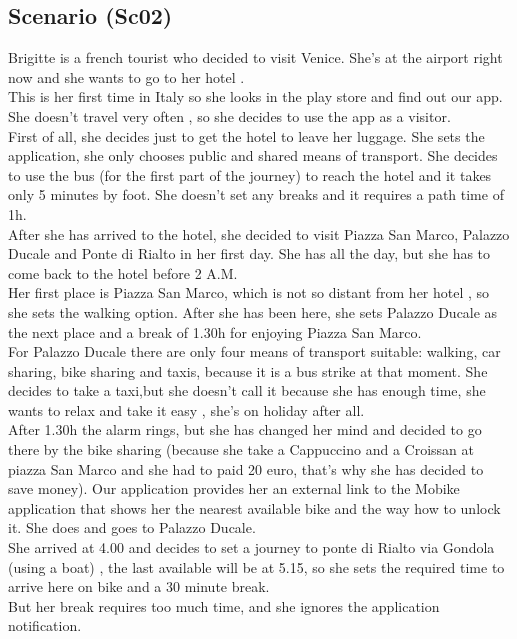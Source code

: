 \documentclass[a4paper,leqno]{book}
\begin{document}
\subsection{Scenario (Sc02) }
Brigitte is a french tourist who decided to visit Venice. She's at the airport right now and she wants to go to her hotel .\\
This is her first time in Italy so she looks in the play store and find out our app.
She doesn't travel very often , so she decides to use the app as a visitor.\\
First of all, she decides just to get the hotel to leave her luggage.
She sets the application, she only chooses public and shared means of transport. 
She decides to use the bus (for the first part of the journey) to reach the hotel and  it takes only 5 minutes by foot. 
She doesn't set any breaks and it requires a path time of 1h.\\
After she has arrived to the hotel, she decided to visit Piazza San Marco, Palazzo Ducale and Ponte di Rialto in her first day.
She has all the day, but she has to come back to the hotel before 2 A.M.\\
Her first place is Piazza San Marco, which is not so distant from her hotel , so she sets the walking option. 
After she has been here, she sets Palazzo Ducale as the next place and a break of 1.30h for enjoying Piazza San Marco.\\
For Palazzo Ducale there are only four means of transport suitable: walking, car sharing, bike sharing and taxis, because it is a bus strike at that moment. 
She decides to take a taxi,but she doesn't call it because she has enough time,  she wants to relax and take it easy , she's on holiday after all.\\
After 1.30h the alarm rings, but she has changed her mind  and decided to go there by the bike sharing (because she take a Cappuccino and a Croissan at piazza San Marco and she had to paid 20 euro, that's why she has decided to save money). 
Our application provides her an external link to the Mobike application that shows her the nearest available bike and the way how to unlock it.
She does and goes to Palazzo Ducale.\\
She arrived at 4.00 and decides to set a journey to ponte di Rialto via Gondola (using a boat) , the last available will be at 5.15, so she sets the required time to arrive here on bike and a 30 minute break.\\
But her break requires too much time, and she ignores the application notification.\\
\end{document}
